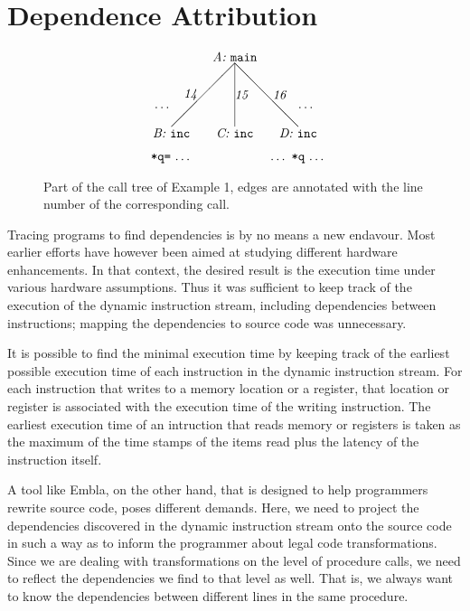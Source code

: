\section{Dependence Attribution}



\begin{figure} \small
\hrulefill
\[
\begin{picture}(160,90)(70,10)
\put(120,90){\makebox(60,10)[c]{\it A:\ \tt main}}
\put(150,90){\line(-1,-1){50}}
\put(150,90){\line( 0,-1){50}}
\put(150,90){\line( 1,-1){50}}
\put(100,60){\makebox(20,10)[r]{\it 14}}
\put(150,60){\makebox(20,10)[l]{\it 15}}
\put(180,60){\makebox(20,10)[l]{\it 16}}
\put(80,50){\makebox(20,10)[r]{\ldots}}
\put(200,50){\makebox(20,10)[l]{\ldots}}
\put(170,30){\makebox(60,10)[c]{\it D:\ \tt inc}}
\put(120,30){\makebox(60,10)[c]{\it C:\ \tt inc}}
\put(70,30){\makebox(60,10)[c]{\it B:\ \tt inc}}
\put(70,10){\makebox(60,10)[c]{{\tt *q=}\ \ldots}}
\put(170,10){\makebox(60,10)[c]{\ldots\ {\tt *q}\ \ldots}}
\end{picture}
\]
\hrulefill
\caption{Part of the call tree of Example 1, edges are annotated 
with the line number of the corresponding call.} 
\label{ffextree}
\end{figure}

Tracing programs to find dependencies is by no means a new endavour. Most 
earlier efforts have however been aimed at studying different hardware 
enhancements. In that context, the desired result is the execution time 
under various hardware assumptions. Thus it was sufficient to keep track
of the execution of the dynamic instruction stream, including dependencies
between instructions; mapping the dependencies to source code was unnecessary.

It is possible to find the minimal execution time by keeping track of the 
earliest possible execution
time of each instruction in the dynamic instruction stream. For each instruction 
that writes to a memory location or a register, that location or register is 
associated with the execution time of the writing instruction. The earliest
execution time of an intruction that reads memory or registers is taken as the
maximum of the time stamps of the items read plus the latency of the instruction 
itself.


A tool like Embla, on the other hand, that is designed to help programmers 
rewrite source code, poses different demands. Here, we need to project 
the dependencies discovered in the dynamic instruction stream onto the 
source code in such a way as to inform the programmer about legal code 
transformations. Since we are dealing with transformations on the level of
procedure calls, we need to reflect the dependencies we find to that level 
as well. That is, we always want to know the dependencies between different 
lines in the same procedure.


